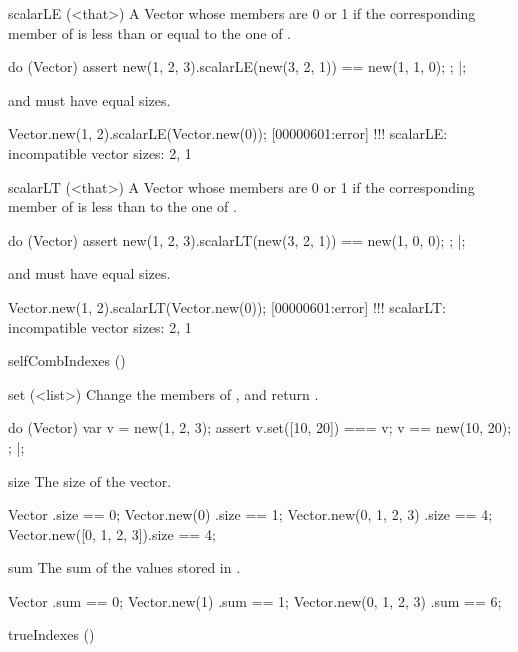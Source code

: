\begin{urbiscriptapi}
\item[scalarLE](<that>)%
  A Vector whose members are 0 or 1 if the corresponding member of \this is
  less than or equal to the one of \that.
\begin{urbiscript}
do (Vector)
{
  assert
  {
    new(1, 2, 3).scalarLE(new(3, 2, 1)) == new(1, 1, 0);
  };
}|;
\end{urbiscript}
  \this and \that must have equal sizes.
\begin{urbiscript}
Vector.new(1, 2).scalarLE(Vector.new(0));
[00000601:error] !!! scalarLE: incompatible vector sizes: 2, 1
\end{urbiscript}

\item[scalarLT](<that>)%
  A Vector whose members are 0 or 1 if the corresponding member of \this is
  less than to the one of \that.
\begin{urbiscript}
do (Vector)
{
  assert
  {
    new(1, 2, 3).scalarLT(new(3, 2, 1)) == new(1, 0, 0);
  };
}|;
\end{urbiscript}
  \this and \that must have equal sizes.
\begin{urbiscript}
Vector.new(1, 2).scalarLT(Vector.new(0));
[00000601:error] !!! scalarLT: incompatible vector sizes: 2, 1
\end{urbiscript}

\item[selfCombIndexes]()%

\item[set](<list>)%
  Change the members of \this, and return \this.
\begin{urbiscript}
do (Vector)
{
  var v = new(1, 2, 3);
  assert
  {
    v.set([10, 20]) === v;
    v == new(10, 20);
  };
}|;
\end{urbiscript}

\item[size]%
  The size of the vector.
\begin{urbiassert}
Vector                  .size == 0;
Vector.new(0)           .size == 1;
Vector.new(0, 1, 2, 3)  .size == 4;
Vector.new([0, 1, 2, 3]).size == 4;
\end{urbiassert}

\item[sum]%
  The sum of the values stored in \this.
\begin{urbiassert}
Vector                  .sum == 0;
Vector.new(1)           .sum == 1;
Vector.new(0, 1, 2, 3)  .sum == 6;
\end{urbiassert}

\item[trueIndexes]()%


\end{urbiscriptapi}

